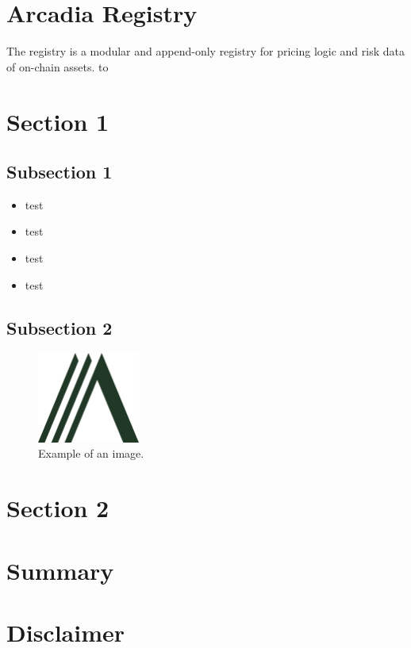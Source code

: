 \documentclass[sigconf,nonacm]{acmart}
\begin{document}
\section{Arcadia Registry}
\label{sec:arcadia-registry}
The registry is a modular and append-only registry for pricing logic and risk data of on-chain assets.
to


\section{Section 1} 
\label{sec:section1}

\lipsum[3]

\subsection{Subsection 1} 
\label{subsec:subsection1}

\lipsum[4]

\begin{itemize}
\item test
\item test
\item test
\item test
\end{itemize}


\subsection{Subsection 2} 
\label{subsec:subsection2}

\lipsum[5]

\begin{figure}
    \label{fig:arcadia-logo}
    \centering
    \includegraphics[width=0.3\textwidth]{images/Logo-Arcadia.png}
    \caption{Example of an image.}
  \end{figure}

\section{Section 2} 
\label{sec:section2}

\lipsum[6]


\section{Summary}
\lipsum[7]




\section*{Disclaimer}
\lipsum[8]
\end{document}
